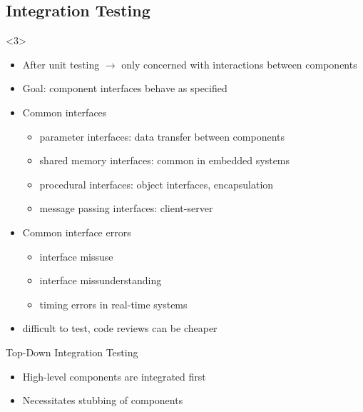 \subsection{Integration Testing}
\begin{frame}<3>{\insertsubsection}
	\slideStagesTesting
\end{frame}


\begin{frame}{\insertsubsection}
	\begin{fancycolumns}[animation=none]
		\begin{definition}{\insertsubsection {}}
			\begin{itemize}
				\item After unit testing $\rightarrow$ only concerned with interactions between components
				\item Goal: component interfaces behave as specified
				\item Common interfaces
				\begin{itemize}
					\item parameter interfaces: data transfer between components
					\item shared memory interfaces: common in embedded systems
					\item procedural interfaces: object interfaces, encapsulation
					\item message passing interfaces: client-server
				\end{itemize}
				\item Common interface errors
				\begin{itemize}
					\item interface missuse
					\item interface missunderstanding
					\item timing errors in real-time systems
				\end{itemize}
				\item difficult to test, code reviews can be cheaper
			\end{itemize}
		\end{definition}
		\pause
		\nextcolumn
		\begin{definition}{Top-Down Integration Testing}
			\begin{itemize}
				\item High-level components are integrated first
				\item Necessitates stubbing of components
			\end{itemize}
		\end{definition} \pause

\end{fancycolumns}
\end{frame}
